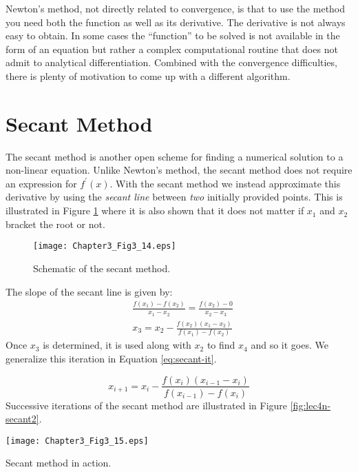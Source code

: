  Newton's method, not directly related to convergence, is that to use the method you need both the function as well as its derivative.  The derivative is not always easy to obtain.  In some cases the ``function'' to be solved is not available in the form of an equation but rather a complex computational routine that does not admit to analytical differentiation.  Combined with the convergence difficulties, there is plenty of motivation to come up with a different algorithm.

\section{Secant Method}
The secant method is another open scheme for finding a numerical solution to a non-linear equation.  Unlike Newton's method, the secant method does not require an expression for $f^{\prime}(x)$.  With the secant method we instead approximate this derivative by using the \emph{secant line} between \emph{two} initially provided points. This is illustrated in Figure \ref{fig:lec4n-secant-schematic} where it is also shown that it does not matter if $x_1$ and $x_2$ bracket the root or not.
\begin{figure}[h!]
\texttt{[image: Chapter3\_Fig3\_14.eps]}
\caption{Schematic of the secant method.}
\label{fig:lec4n-secant-schematic}
\end{figure} 

\noindent The slope of the secant line is given by:
\begin{align*}
&\frac{f(x_1) - f(x_2)}{x_1 - x_2} = \frac{f(x_2) - 0}{x_2 - x_3} \\
& x_3 = x_2 - \frac{f(x_2)(x_1 - x_2)}{f(x_1)-f(x_2)}
\end{align*}
Once $x_3$ is determined, it is used along with $x_2$ to find $x_4$ and so it goes.  We generalize this iteration in Equation \ref{eq:secant-it}.

\begin{equation}
x_{i+1} = x_i - \frac{f(x_i)(x_{i-1} - x_i)}{f(x_{i-1}) - f(x_i)}
\label{eq:secant-it}
\end{equation}
Successive iterations of the secant method are illustrated in Figure \ref{fig:lec4n-secant2}.
\begin{marginfigure}
\texttt{[image: Chapter3\_Fig3\_15.eps]}
\caption{Secant method in action.}
\label{fig:lec4n-secant2}
\end{marginfigure}

